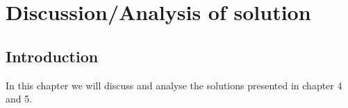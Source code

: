 \chapter{Discussion/Analysis of solution}
\section{Introduction}
In this chapter we will discuss and analyse the solutions presented in chapter 4 and 5.